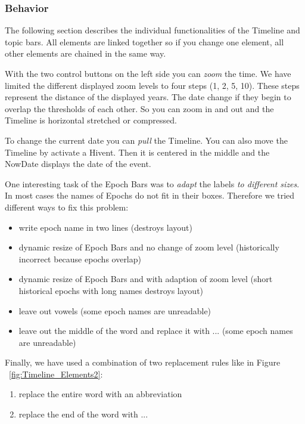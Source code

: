 \subsubsection{Behavior}
The following section describes the individual functionalities of the Timeline and topic bars. All elements are linked together so if you change one element, all other elements are chained in the same way.

With the two control buttons on the left side you can \textit{zoom} the time. We have limited the different displayed zoom levels to four steps (1, 2, 5, 10). These steps represent the distance of the displayed years. The date change if they begin to overlap the thresholds of each other. So you can zoom in and out and the Timeline is horizontal stretched or compressed.

To change the current date you can \textit{pull} the Timeline. You can also move the Timeline by activate a Hivent. Then it is centered in the middle and the NowDate displays the date of the event.

One interesting task of the Epoch Bars was to \textit{adapt} the labels \textit{to different sizes}. In most cases the names of Epochs do not fit in their boxes. Therefore we tried different ways to fix this problem:

\begin{itemize}
	\item write epoch name in two lines (destroys layout)
	\item dynamic resize of Epoch Bars and no change of zoom level (historically incorrect because epochs overlap)
	\item dynamic resize of Epoch Bars and with adaption of zoom level (short historical epochs with long names destroys layout)
	\item leave out vowels (some epoch names are unreadable)
	\item leave out the middle of the word and replace it with ... (some epoch names are unreadable)
\end{itemize}

Finally, we have used a combination of two replacement rules like in Figure ~\ref{fig:Timeline_Elements2}:

\begin{enumerate}
	\item replace the entire word with an abbreviation
	\item replace the end of the word with ...
\end{enumerate}

